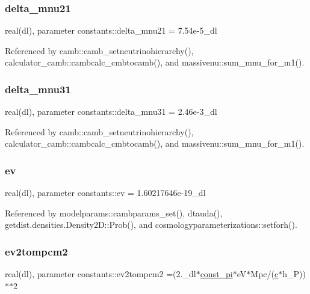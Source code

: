 \subsubsection{\texorpdfstring{delta\+\_\+mnu21}{delta\_mnu21}}
{\footnotesize\ttfamily real(dl), parameter constants\+::delta\+\_\+mnu21 = 7.\+54e-\/5\+\_\+dl}



Referenced by camb\+::camb\+\_\+setneutrinohierarchy(), calculator\+\_\+camb\+::cambcalc\+\_\+cmbtocamb(), and massivenu\+::sum\+\_\+mnu\+\_\+for\+\_\+m1().

\mbox{\label{namespaceconstants_a26e4749bd1491194966f0f1e11188b97}} 
\subsubsection{\texorpdfstring{delta\+\_\+mnu31}{delta\_mnu31}}
{\footnotesize\ttfamily real(dl), parameter constants\+::delta\+\_\+mnu31 = 2.\+46e-\/3\+\_\+dl}



Referenced by camb\+::camb\+\_\+setneutrinohierarchy(), calculator\+\_\+camb\+::cambcalc\+\_\+cmbtocamb(), and massivenu\+::sum\+\_\+mnu\+\_\+for\+\_\+m1().

\mbox{\label{namespaceconstants_addbb41b1f5963fd51db70e3dced89700}} 
\subsubsection{\texorpdfstring{ev}{ev}}
{\footnotesize\ttfamily real(dl), parameter constants\+::ev = 1.\+60217646e-\/19\+\_\+dl}



Referenced by modelparams\+::cambparams\+\_\+set(), dtauda(), getdist.\+densities.\+Density2\+D\+::\+Prob(), and cosmologyparameterizations\+::setforh().

\mbox{\label{namespaceconstants_a1ebbb6c793da19f6fb8448ab875e3cc8}} 
\subsubsection{\texorpdfstring{ev2tompcm2}{ev2tompcm2}}
{\footnotesize\ttfamily real(dl), parameter constants\+::ev2tompcm2 =(2.\+\_\+dl$\ast$\mbox{\hyperlink{namespaceconstants_ae6b5af15d3fb28a3dba468486c548447}{const\+\_\+pi}}$\ast$eV$\ast$Mpc/(\mbox{\hyperlink{namespaceconstants_acf9c352e48b37fa8a9aff3e5957246b8}{c}}$\ast$h\+\_\+P))$\ast$$\ast$2}



